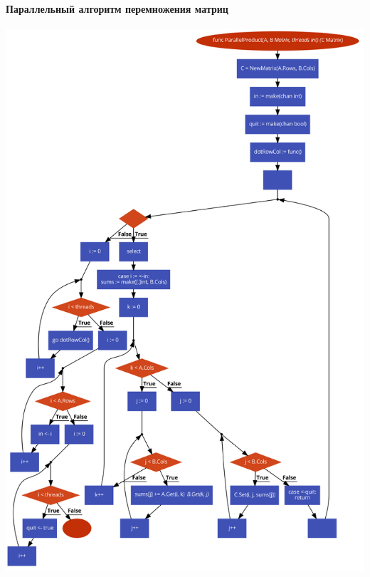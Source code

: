\documentclass[utf8x, 12pt]{G7-32} %
\begin{document}
\paragraph{Параллельный алгоритм перемножения матриц}
\begin{center}
	\includegraphics[scale=0.28]{images/matrixParallel.png}
\end{center}

\newpage
\end{document}
